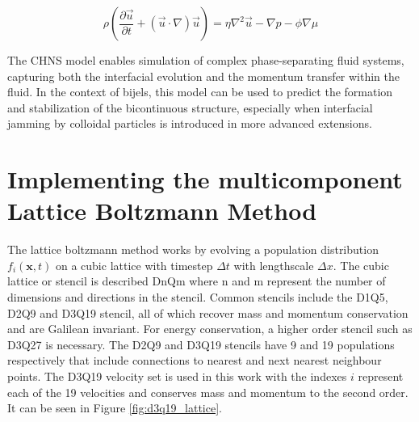 \begin{equation}
    \rho \left(\frac{\partial\vec{u}}{\partial t} + (\vec{u}\cdot\nabla)\vec{u} \right) = \eta \nabla^2 \vec{u} - \nabla p - \phi \nabla \mu
\end{equation}


The CHNS model enables simulation of complex phase-separating fluid systems, capturing both the interfacial evolution and the momentum transfer within the fluid. In the context of bijels, this 
model can be used to predict the formation and stabilization of the bicontinuous structure, especially when interfacial jamming by colloidal particles is introduced in more advanced extensions.

\section{Implementing the multicomponent Lattice Boltzmann Method} 
\label{section:lbm_hydrodynamics}

The lattice boltzmann method works by evolving a population distribution $f_{i}(\mathbf{x}, t)$ on a cubic lattice with 
timestep $\Delta t$ with lengthscale $\Delta x$. \cite{qian_lattice_1992, succi_lattice_2018, he_theory_1997} The cubic lattice or stencil is described
DnQm where n and m represent the number of dimensions and directions in the stencil. \cite{succi_lattice_2018, schmieschek_lb3d_2017}
Common stencils include the D1Q5, D2Q9 and D3Q19 stencil, all of which recover mass and momentum conservation and are Galilean invariant.
For energy conservation, a higher order stencil such as D3Q27 is necessary. The D2Q9 and D3Q19 stencils have 9 and 19 populations respectively that include 
connections to nearest and next nearest neighbour points. The D3Q19 
velocity set is used in this work with the indexes $i$ represent each of the 19 velocities and conserves mass and momentum 
to the second order. It can be seen in Figure \ref{fig:d3q19_lattice}. 

